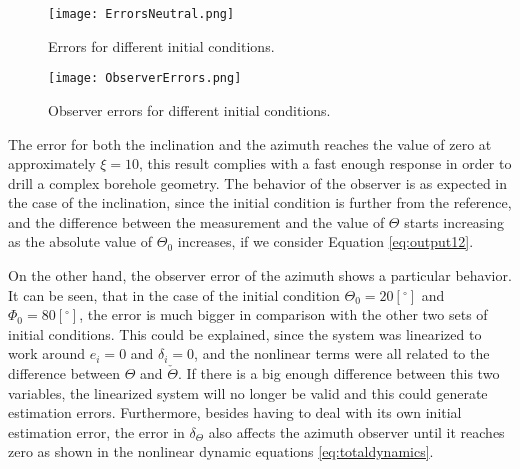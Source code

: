 \documentclass[main.tex]{subfiles}
\begin{document}
\begin{figure}[H]\centering
	\texttt{[image: ErrorsNeutral.png]}
	\caption{Errors for different initial conditions.
		\label{fig:ErrorNeutral} }
\end{figure}

\begin{figure}[H]\centering
	\texttt{[image: ObserverErrors.png]}
	\caption{Observer errors for different initial conditions.
		\label{fig:ObserverErrors} }
\end{figure}

The error for both the inclination and the azimuth reaches the value of zero at approximately $\xi = 10$, this result complies with a fast enough response in order to drill a complex borehole geometry. The behavior of the observer is as expected in the case of the inclination, since the initial condition is further from the reference, and the difference between the measurement and the value of $\Theta$ starts increasing as the absolute value of $\Theta_0$ increases, if we consider Equation \eqref{eq:output12}. 

On the other hand, the observer error of the azimuth shows a particular behavior. It can be seen, that in the case of the initial condition $\Theta_0 = 20 [^{\circ}]$ and $\Phi_0 = 80[^{\circ}]$, the error is much bigger in comparison with the other two sets of initial conditions. This could be explained, since the system was linearized to work around $e_i = 0$ and $\delta_i = 0$, and the nonlinear terms were all related to the difference between $\Theta$ and $\check{\Theta}$. If there is a big enough difference between this two variables, the linearized system will no longer be valid and this could generate estimation errors. Furthermore, besides having to deal with its own initial estimation error, the error in $\delta_\Theta$ also affects the azimuth observer until it reaches zero as shown in the nonlinear dynamic equations \eqref{eq:totaldynamics}.
\end{document}
